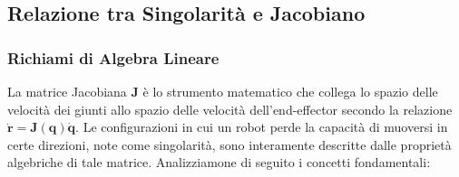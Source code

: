 \documentclass[11pt, a4paper]{report}
\begin{document}
\newpage
\subsection{Relazione tra Singolarità e Jacobiano}
\subsubsection{Richiami di Algebra Lineare}

La matrice Jacobiana \(\bm{J}\) è lo strumento matematico che collega lo spazio delle velocità dei giunti allo spazio delle velocità dell'end-effector secondo la relazione \(\bm{\dot{r}} = \bm{J}(\bm{q})\dot{\bm{q}}\). Le configurazioni in cui un robot perde la capacità di muoversi in certe direzioni, note come singolarità, sono interamente descritte dalle proprietà algebriche di tale matrice. Analizziamone di seguito i concetti fondamentali:
\end{document}
